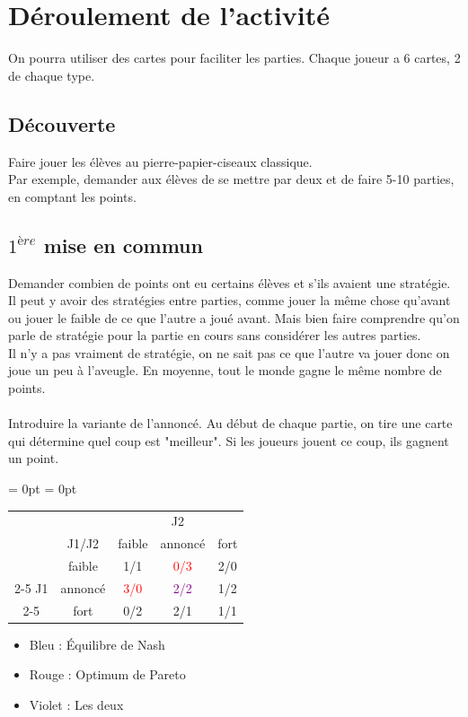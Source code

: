 \documentclass{article}
\begin{document}
\section{Déroulement de l'activité}
On pourra utiliser des cartes pour faciliter les parties. Chaque joueur a 6 cartes, 2 de chaque type.

\subsection{Découverte}
Faire jouer les élèves au pierre-papier-ciseaux classique.\\
Par exemple, demander aux élèves de se mettre par deux et de faire 5-10 parties, en comptant les points.
\subsection{$1^{ère}$ mise en commun}
Demander combien de points ont eu certains élèves et s'ils avaient une stratégie. 
Il peut y avoir des stratégies entre parties, comme jouer la même chose qu'avant ou jouer le faible de ce que l'autre a joué avant. Mais bien faire comprendre qu'on parle de stratégie pour la partie en cours sans considérer les autres parties.\\
Il n'y a pas vraiment de stratégie, on ne sait pas ce que l'autre va jouer donc on joue un peu à l'aveugle. En moyenne, tout le monde gagne le même nombre de points.
\\
\\
Introduire la variante de l'annoncé. Au début de chaque partie, on tire une carte qui détermine quel coup est "meilleur". Si les joueurs jouent ce coup, ils gagnent un point. 

\begin{table}[H]
\renewcommand{\arraystretch}{2}%
\centering
\aboverulesep = 0pt
\belowrulesep = 0pt
\begin{tabular}{cc|c|c|c}
          & & \multicolumn{3}{c}{J2} \\ 
    & J1/J2 & faible & annoncé & fort \\ \midrule
    & faible & 1/1 & \textcolor{red}{0/3} & 2/0  \\ \cmidrule{2-5}
    J1 &annoncé & \textcolor{red}{3/0} & \textcolor{purple}{2/2} & 1/2 \\ \cmidrule{2-5}
     & fort & 0/2 & 2/1 & 1/1 
\end{tabular}
\end{table}

\begin{itemize}
    \item Bleu : Équilibre de Nash
    \item Rouge : Optimum de Pareto
    \item Violet : Les deux
\end{itemize}
\end{document}
